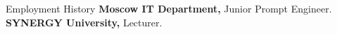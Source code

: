 \begin{rubric}{Employment History}
%
	\textbf{Moscow IT Department,} Junior Prompt Engineer.
%
%
\entry*[2020 -- 2024]%
	\textbf{SYNERGY University,} Lecturer.
%
\end{rubric}